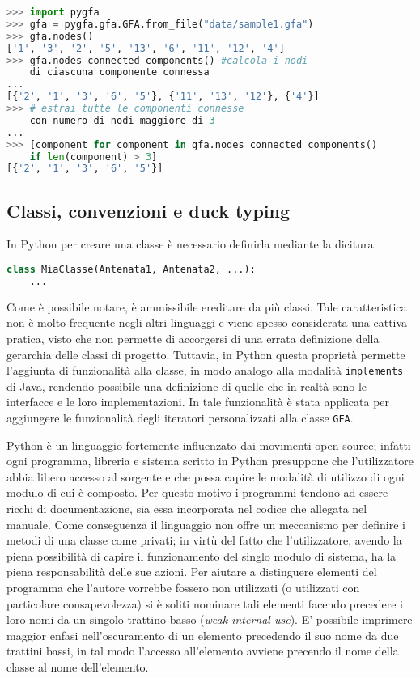 \captionsetup{justification=centering, singlelinecheck=false}
\begin{lstlisting}[language=Python, frame=topline, caption=Un esempio  dell'espressività\\del linguaggio applicata a \pygfa.]
>>> import pygfa
>>> gfa = pygfa.gfa.GFA.from_file("data/sample1.gfa")
>>> gfa.nodes()
['1', '3', '2', '5', '13', '6', '11', '12', '4']
>>> gfa.nodes_connected_components() #calcola i nodi
	di ciascuna componente connessa
...
[{'2', '1', '3', '6', '5'}, {'11', '13', '12'}, {'4'}]
>>> # estrai tutte le componenti connesse
	con numero di nodi maggiore di 3
...
>>> [component for component in gfa.nodes_connected_components()
	if len(component) > 3]
[{'2', '1', '3', '6', '5'}]
\end{lstlisting}
\captionsetup{justification=justified, singlelinecheck=false}

\subsection{Classi, convenzioni e duck typing}
In Python per creare una classe è necessario definirla mediante
la dicitura:
\begin{lstlisting}[language=Python]
class MiaClasse(Antenata1, Antenata2, ...):
	...
\end{lstlisting}
Come è possibile notare, è ammissibile ereditare da più classi.
Tale caratteristica non è molto frequente negli altri linguaggi e
viene spesso considerata una cattiva pratica, visto che non
permette di accorgersi di una errata definizione della gerarchia delle
classi di progetto. Tuttavia, in Python questa proprietà permette
l'aggiunta di funzionalità alla classe, in modo analogo alla modalità
\texttt{implements} di Java, rendendo possibile una definizione di
quelle che in realtà sono le interfacce e le loro implementazioni.
In \pygfa tale funzionalità è stata applicata per aggiungere le
funzionalità degli iteratori personalizzati alla classe \texttt{GFA}.

Python è un linguaggio fortemente influenzato dai movimenti
open source; infatti ogni programma, libreria e sistema scritto in Python
presuppone che l'utilizzatore abbia libero accesso al sorgente e che
possa capire le modalità di utilizzo di ogni modulo di cui è composto.
Per questo motivo i programmi tendono ad essere ricchi di documentazione,
sia essa incorporata nel codice che allegata nel manuale.
Come conseguenza il linguaggio non offre un meccanismo per definire i
metodi di una classe come privati; in virtù del fatto che l'utilizzatore, avendo
la piena possibilità di capire il funzionamento del singlo modulo di sistema,
ha la piena responsabilità delle sue azioni.
Per aiutare a distinguere elementi del programma che l'autore vorrebbe
fossero non utilizzati (o utilizzati con particolare consapevolezza) si è
soliti nominare tali elementi facendo precedere i loro nomi da un singolo
trattino basso (\emph{weak internal use}). E' possibile imprimere
maggior enfasi nell'oscuramento di un elemento precedendo
il suo nome da due trattini bassi, in tal modo l'accesso
all'elemento avviene precendo il nome della classe al nome dell'elemento.

